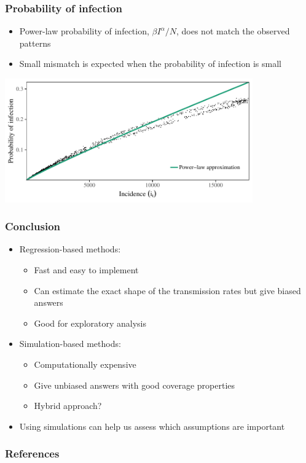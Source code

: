 \documentclass{beamer}
\begin{document}
\begin{frame}
\frametitle{Probability of infection}
\begin{itemize}
	\item Power-law probability of infection, $\beta I^\alpha/N$, does not match the observed patterns 
	\item Small mismatch is expected when the probability of infection is small
\end{itemize}
\begin{center}
\includegraphics[width=0.8\textwidth]{poi.pdf}
\end{center}
\end{frame}

\begin{frame}
\frametitle{Conclusion}
\begin{itemize}
	\itemsep1em
	\item Regression-based methods:
	\begin{itemize}
		\item Fast and easy to implement
		\item Can estimate the exact shape of the transmission rates but give biased answers
		\item Good for exploratory analysis
	\end{itemize}
	\item Simulation-based methods:
	\begin{itemize}
		\item Computationally expensive
		\item Give unbiased answers with good coverage properties
		\item Hybrid approach? \citep{hooker2010parameterizing}
	\end{itemize}
	\item Using simulations can help us assess which assumptions are important
\end{itemize}
\end{frame}

\begin{frame}
\frametitle{References}
\tiny

\end{frame}
\end{document}

